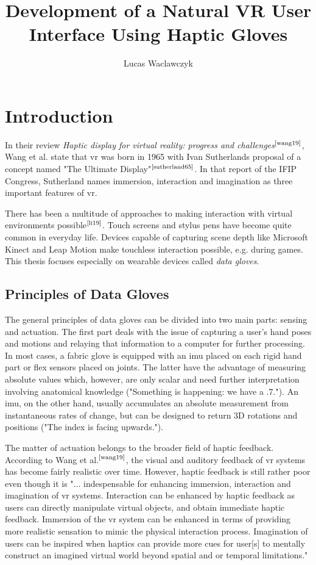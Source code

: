 \documentclass[hyperref, bachelorofscience]{cgvpub}
\author{Lucas Waclawczyk}
\title{Development of a Natural VR User Interface Using Haptic Gloves}
\newcommand{\newcite}[1]{$ ^{\text{\cite{#1}}} $}
\begin{document}
\glsaddall
	
\chapter{Introduction}
In their review \emph{Haptic display for virtual reality: progress and challenges}\newcite{wang19}, Wang et al. state that \gls{vr} was born in 1965 with Ivan Sutherlands proposal of a concept named "The Ultimate Display"\newcite{sutherland65}. In that report of the IFIP Congress, Sutherland names immersion, interaction and imagination as three important features of \acrshort{vr}. 

There has been a multitude of approaches to making interaction with virtual environments possible\newcite{li19}. Touch screens and stylus pens have become quite common in everyday life. Devices capable of capturing scene depth like Microsoft Kinect and Leap Motion make touchless interaction possible, e.g. during games. This thesis focuses especially on wearable devices called \emph{data gloves}.

\section{Principles of Data Gloves}
The general principles of data gloves can be divided into two main parts: sensing and actuation. The first part deals with the issue of capturing a user's hand poses and motions and relaying that information to a computer for further processing. In most cases, a fabric glove is equipped with an \acrfull{imu} placed on each rigid hand part or flex sensors placed on joints. The latter have the advantage of measuring absolute values which, however, are only scalar and need further interpretation involving anatomical knowledge ("Something is happening: we have a $ .7 $."). An \acrfull{imu}, on the other hand, usually accumulates an absolute measurement from instantaneous rates of change, but can be designed to return 3D rotations and positions ("The index is facing upwards.").

The matter of actuation belongs to the broader field of haptic feedback. According to Wang et al.\newcite{wang19}, the visual and auditory feedback of \acrshort{vr} systems has become fairly realistic over time. However, haptic feedback is still rather poor even though it is "$\dots$ indespensable for enhancing immersion, interaction and imagination of \acrshort{vr} systems. Interaction can be enhanced by haptic feedback as users can directly manipulate virtual objects, and obtain immediate haptic feedback. Immersion of the \acrshort{vr} system can be enhanced in terms of providing more realistic sensation to mimic the physical interaction process. Imagination of users can be inspired when haptics can provide more cues for user[s] to mentally construct an imagined virtual world beyond spatial and or temporal limitations."
\end{document}
